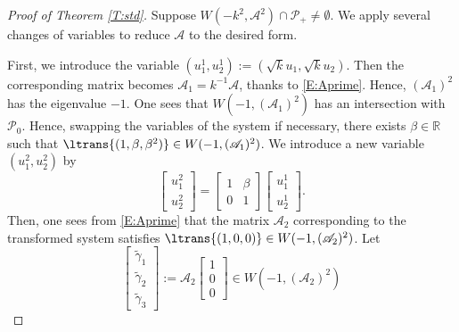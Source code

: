 \documentclass[11pt,a4paper,oneside]{amsart}
\theoremstyle{plain}
\theoremstyle{remark}
\numberwithin{equation}{section}
\newcommand{\R}{\mathbb{R}}
\theoremstyle{definition}
\begin{document}
\begin{proof}[Proof of Theorem \ref{T:std}]
Suppose $W(-k^2,\mathscr{A}^2) \cap \mathcal{P}_+ \neq \emptyset$.
We apply several changes of variables to reduce $\mathscr{A}$ to the desired form.

First, we introduce the variable $(u_1^1,u_2^1):=(\sqrt{k} u_1, \sqrt{k} u_2 )$. Then the corresponding matrix  becomes
$\mathscr{A}_1=k^{-1} \mathscr{A}$, thanks to \eqref{E:Aprime}.
Hence, 
$(\mathscr{A}_1)^2$ has the eigenvalue $-1$.
%
One sees that $W(-1,(\mathscr{A}_1)^2)$
has an intersection with $\mathcal{P}_0$.
Hence, swapping the variables of the system if necessary,
there exists $\beta \in \R$ such that
$\ltrans{(1,\beta,\beta^2)} \in W(-1,(\mathscr{A}_1)^2)$.
We introduce a new variable $(u_1^2,u^2_2)$ by
\[
	\begin{bmatrix} u_1^2 \\ u_2^2 \end{bmatrix}
	= \begin{bmatrix} 1 & \beta \\ 0 & 1 \end{bmatrix}
	\begin{bmatrix} u_1^1 \\ u_2^1 \end{bmatrix}.
\]
Then, one sees from \eqref{E:Aprime} that
the matrix $\mathscr{A}_2$ corresponding to the transformed system
satisfies
$\ltrans{(1,0,0)} \in W(-1,(\mathscr{A}_2)^2)$.
Let 
\[
	 \begin{bmatrix} \widetilde{\gamma}_1 \\ \widetilde{\gamma}_2 \\ \widetilde{\gamma}_3 \end{bmatrix}:=\mathscr{A}_2\begin{bmatrix} 1 \\0\\0 \end{bmatrix} \in W(-1,(\mathscr{A}_2)^2)
\]
\end{proof}
\end{document}
